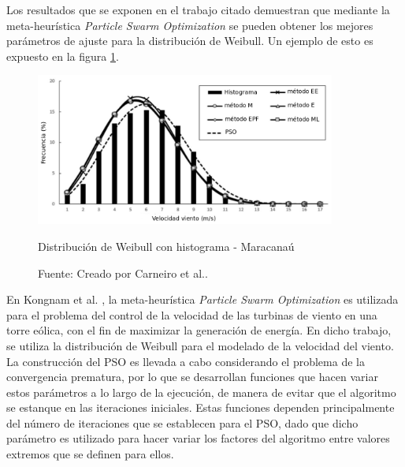 Los resultados que se exponen en el trabajo citado demuestran que mediante la meta-heurística \emph{Particle Swarm Optimization} se pueden obtener los mejores parámetros de ajuste para la distribución de Weibull. Un ejemplo de esto es expuesto en la figura \ref{fig:pso_fit}.\\
\begin{figure}[h!]
    \centering    
    \includegraphics[height=50mm]{figures/pso_fit.png} 
    \caption{Distribución de Weibull con histograma - Maracanaú}
    \vspace{-.25cm} 
    \caption*{Fuente: Creado por Carneiro et al.\cite{Carneiro15}.}
    \label{fig:pso_fit}
\end{figure}
En Kongnam et al. \cite{Kongnam15}, la meta-heurística \emph{Particle Swarm Optimization} es utilizada para el problema del control de la velocidad de las turbinas de viento en una torre eólica, con el fin de maximizar la generación de energía. En dicho trabajo, se utiliza la distribución de Weibull para el modelado de la velocidad del viento. La construcción del PSO es llevada a cabo considerando el problema de la convergencia prematura, por lo que se desarrollan funciones que hacen variar estos parámetros a lo largo de la ejecución, de manera de evitar que el algoritmo se estanque en las iteraciones iniciales. Estas funciones dependen principalmente del número de iteraciones que se establecen para el PSO, dado que dicho parámetro es utilizado para hacer variar los factores del algoritmo entre valores extremos que se definen para ellos.\\

